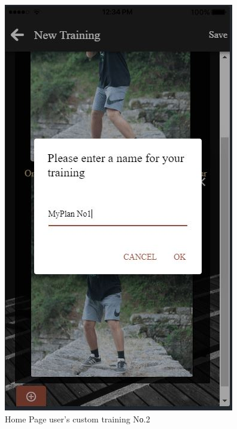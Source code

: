 \documentclass[a4paper,12pt]{article}
\begin{document}
			\begin{figure}[!htb]
				\caption{Home Page user's custom training Νο.2}
				\vspace*{0.5cm}

				  \includegraphics[width=\linewidth]{plan5}
				  

\end{figure}
\end{document}
